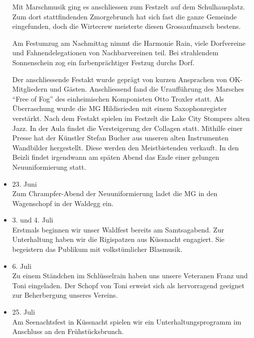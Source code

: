\begin{history}
\begin{itemize}
        Mit Marschmusik ging es anschliessen zum Festzelt auf dem
        Schulhausplatz. Zum dort stattfindenden Zmorgebrunch hat sich fast die
        ganze Gemeinde eingefunden, doch die Wirtecrew meisterte diesen
        Grossaufmarsch bestens.

        Am Festumzug am Nachmittag nimmt die Harmonie Rain, viele Dorfvereine
        und Fahnendelegationen von Nachbarvereinen teil. Bei strahlendem
        Sonnenschein zog ein farbenprächtiger Festzug durchs Dorf.

        Der anschliessende Festakt wurde geprägt von kurzen Ansprachen
        von OK-Mitgliedern und Gästen. Anschliessend fand die Uraufführung des
        Marsches \enquote{Free of Fog} des einheimischen Komponisten Otto
        Troxler statt. Als Überraschung wurde die MG Hildisrieden mit einem
        Saxophonregister verstärkt. Nach dem Festakt spielen im Festzelt die
        Lake City Stompers alten Jazz. In der Aula findet die Versteigerung der
        Collagen statt. Mithilfe einer Presse hat der Künstler Stefan Bucher aus
        unseren alten Instrumenten Wandbilder hergestellt. Diese werden den
        Meistbietenden verkauft. In den Beizli findet irgendwann am späten Abend
        das Ende einer gelungen Neuuniformierung statt.

        \item[]23. Juni\\
        Zum Chrampfer-Abend der Neuuniformierung ladet die MG in den Wagenschopf
        in der Waldegg ein.

        \item[]3. und 4. Juli\\
        Erstmals beginnen wir unser Waldfest bereits am Samtsagabend. Zur
        Unterhaltung haben wir die Rigispatzen aus Küssnacht engagiert. Sie
        begeistern das Publikum mit volkstümlicher Blasmusik.

        \item[]6. Juli\\
        Zu einem Ständchen im Schlüsselrain haben uns unsere Veteranen Franz und
        Toni eingeladen. Der Schopf von Toni erweist sich als hervorragend
        geeignet zur Beherbergung unseres Vereins.

        \item[]25. Juli\\
        Am Seenachtsfest in Küssnacht spielen wir ein Unterhaltungsprogramm im
        Anschluss an den Frühstücksbrunch.


\end{itemize}
\end{history}
